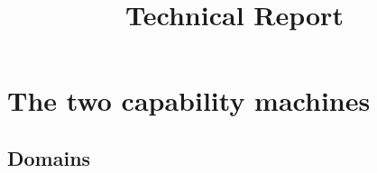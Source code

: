 \documentclass[a3paper]{article}
\title{Technical Report}
\newcommand\lau[1]{{\color{purple} \sf \footnotesize {LS: #1}}\\}
\newcommand\dominique[1]{{\color{purple} \sf \footnotesize {DD: #1}}\\}
\begin{document}
\maketitle
\tableofcontents
\section{The two capability machines}
\subsection{Domains}
\label{sec:domains}

\end{document}
